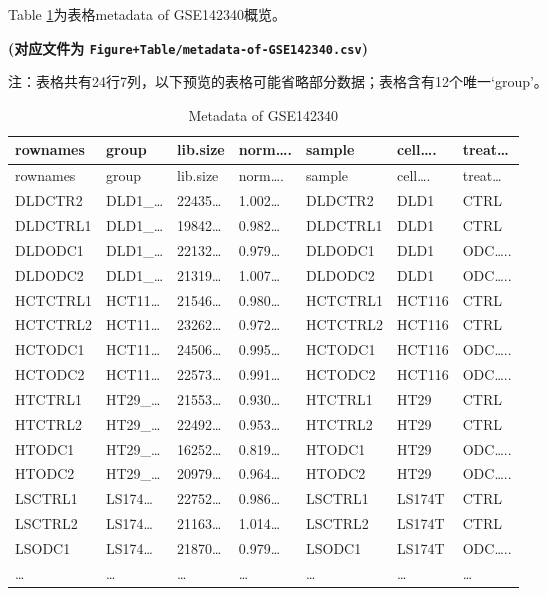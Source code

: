 \documentclass[
]{article}
\begin{document}
Table \ref{tab:metadata-of-GSE142340}为表格metadata of GSE142340概览。

\textbf{(对应文件为 \texttt{Figure+Table/metadata-of-GSE142340.csv})}

\begin{center}\begin{tcolorbox}[colback=gray!10, colframe=gray!50, width=0.9\linewidth, arc=1mm, boxrule=0.5pt]注：表格共有24行7列，以下预览的表格可能省略部分数据；表格含有12个唯一`group'。
\end{tcolorbox}
\end{center}

\begin{longtable}[]{@{}lllllll@{}}
\caption{\label{tab:metadata-of-GSE142340}Metadata of GSE142340}\tabularnewline
\toprule
rownames & group & lib.size & norm\ldots. & sample & cell\ldots. & treat\ldots{}\tabularnewline
\midrule
\endfirsthead
\toprule
rownames & group & lib.size & norm\ldots. & sample & cell\ldots. & treat\ldots{}\tabularnewline
\midrule
\endhead
DLDCTR2 & DLD1\_\ldots{} & 22435\ldots{} & 1.002\ldots{} & DLDCTR2 & DLD1 & CTRL\tabularnewline
DLDCTRL1 & DLD1\_\ldots{} & 19842\ldots{} & 0.982\ldots{} & DLDCTRL1 & DLD1 & CTRL\tabularnewline
DLDODC1 & DLD1\_\ldots{} & 22132\ldots{} & 0.979\ldots{} & DLDODC1 & DLD1 & ODC\ldots..\tabularnewline
DLDODC2 & DLD1\_\ldots{} & 21319\ldots{} & 1.007\ldots{} & DLDODC2 & DLD1 & ODC\ldots..\tabularnewline
HCTCTRL1 & HCT11\ldots{} & 21546\ldots{} & 0.980\ldots{} & HCTCTRL1 & HCT116 & CTRL\tabularnewline
HCTCTRL2 & HCT11\ldots{} & 23262\ldots{} & 0.972\ldots{} & HCTCTRL2 & HCT116 & CTRL\tabularnewline
HCTODC1 & HCT11\ldots{} & 24506\ldots{} & 0.995\ldots{} & HCTODC1 & HCT116 & ODC\ldots..\tabularnewline
HCTODC2 & HCT11\ldots{} & 22573\ldots{} & 0.991\ldots{} & HCTODC2 & HCT116 & ODC\ldots..\tabularnewline
HTCTRL1 & HT29\_\ldots{} & 21553\ldots{} & 0.930\ldots{} & HTCTRL1 & HT29 & CTRL\tabularnewline
HTCTRL2 & HT29\_\ldots{} & 22492\ldots{} & 0.953\ldots{} & HTCTRL2 & HT29 & CTRL\tabularnewline
HTODC1 & HT29\_\ldots{} & 16252\ldots{} & 0.819\ldots{} & HTODC1 & HT29 & ODC\ldots..\tabularnewline
HTODC2 & HT29\_\ldots{} & 20979\ldots{} & 0.964\ldots{} & HTODC2 & HT29 & ODC\ldots..\tabularnewline
LSCTRL1 & LS174\ldots{} & 22752\ldots{} & 0.986\ldots{} & LSCTRL1 & LS174T & CTRL\tabularnewline
LSCTRL2 & LS174\ldots{} & 21163\ldots{} & 1.014\ldots{} & LSCTRL2 & LS174T & CTRL\tabularnewline
LSODC1 & LS174\ldots{} & 21870\ldots{} & 0.979\ldots{} & LSODC1 & LS174T & ODC\ldots..\tabularnewline
\ldots{} & \ldots{} & \ldots{} & \ldots{} & \ldots{} & \ldots{} & \ldots{}\tabularnewline
\bottomrule
\end{longtable}
\end{document}
